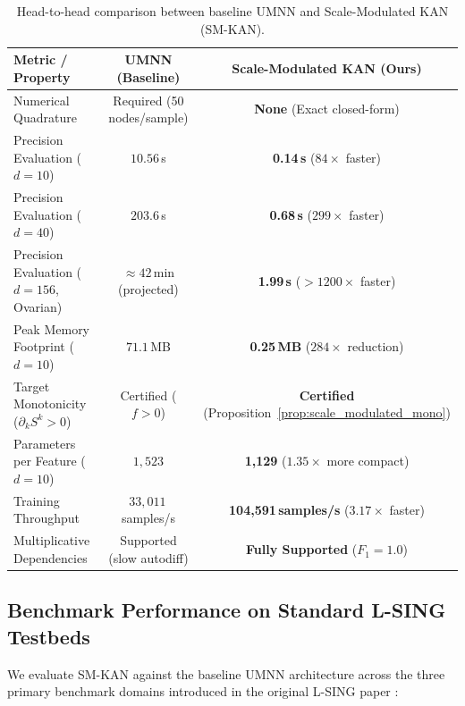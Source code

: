 \documentclass[11pt,a4paper]{article}
\theoremstyle{plain}
\theoremstyle{definition}
\theoremstyle{remark}
\begin{document}
\begin{table}[H]
\centering
\footnotesize
\setlength{\tabcolsep}{4.5pt}
\caption{Head-to-head comparison between baseline UMNN and Scale-Modulated KAN (SM-KAN).}
\label{tab:comparison}
\begin{tabular}{lcc}
\toprule
\textbf{Metric / Property} & \textbf{UMNN (Baseline)} & \textbf{Scale-Modulated KAN (Ours)} \\
\midrule
Numerical Quadrature & Required (50 nodes/sample) & \textbf{None} (Exact closed-form) \\
Precision Evaluation ($d=10$) & $10.56$\,s & \textbf{0.14\,s} ($84\times$ faster) \\
Precision Evaluation ($d=40$) & $203.6$\,s & \textbf{0.68\,s} ($299\times$ faster) \\
Precision Evaluation ($d=156$, Ovarian) & $\approx 42$\,min (projected) & \textbf{1.99\,s} ($>1200\times$ faster) \\
Peak Memory Footprint ($d=10$) & $71.1$\,MB & \textbf{0.25\,MB} ($284\times$ reduction) \\
Target Monotonicity ($\partial_k S^k > 0$) & Certified ($f > 0$) & \textbf{Certified} (Proposition~\ref{prop:scale_modulated_mono}) \\
Parameters per Feature ($d=10$) & $1{,}523$ & \textbf{1{,}129} ($1.35\times$ more compact) \\
Training Throughput & $33{,}011$\,samples/s & \textbf{104{,}591\,samples/s} ($3.17\times$ faster) \\
Multiplicative Dependencies & Supported (slow autodiff) & \textbf{Fully Supported} ($F_1 = 1.0$) \\
\bottomrule
\end{tabular}
\end{table}

\subsection{Benchmark Performance on Standard L-SING Testbeds}
\label{subsec:lsing_benchmarks}

We evaluate SM-KAN against the baseline UMNN architecture across the three primary benchmark domains introduced in the original L-SING paper \cite{liaw2025learning}:
\end{document}
